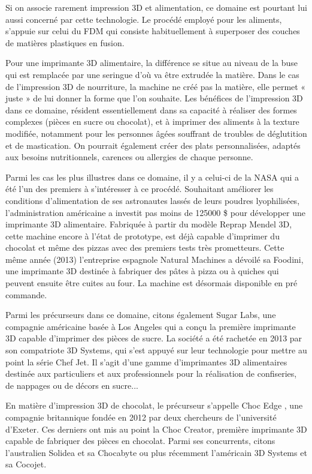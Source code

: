 \documentclass{article}
\begin{document}
Si on associe rarement impression 3D et alimentation, ce domaine est pourtant lui aussi concerné par cette technologie. Le procédé employé pour les aliments, s'appuie sur celui du FDM qui consiste habituellement à superposer des couches de matières plastiques en fusion.\hfill
 \par\leavevmode\par
Pour une imprimante 3D alimentaire, la différence se situe au niveau de la buse qui est remplacée par une seringue d'où va être extrudée la matière. Dans le cas de l'impression 3D de nourriture, la machine ne créé pas la matière, elle permet « juste » de lui donner la forme que l'on souhaite. Les bénéfices de l'impression 3D dans ce domaine, résident essentiellement dans sa capacité à réaliser des formes complexes (pièces en sucre ou chocolat), et à imprimer des aliments à la texture modifiée, notamment pour les personnes âgées souffrant de troubles de déglutition et de mastication. On pourrait également créer des plats personnalisées, adaptés aux besoins nutritionnels, carences ou allergies de chaque
personne.\hfill
 \par\leavevmode\par
Parmi les cas les plus illustres dans ce domaine, il y a celui-ci de la NASA qui a été l'un des premiers à s'intéresser à ce procédé. Souhaitant améliorer les conditions d'alimentation de ses astronautes lassés de leurs poudres lyophilisées, l'administration américaine a investit pas moins de 125000 \$ pour développer une imprimante 3D alimentaire. Fabriquée à partir du modèle Reprap Mendel 3D, cette machine encore à l'état de prototype, est déjà capable d'imprimer du chocolat et même des pizzas avec des premiers tests très prometteurs. Cette même année (2013) l'entreprise espagnole Natural Machines a dévoilé sa Foodini, une imprimante 3D destinée à fabriquer des pâtes à pizza ou à quiches qui peuvent ensuite être cuites au four. La machine est désormais disponible en pré commande.\hfill
 \par\leavevmode\par
Parmi les précurseurs dans ce domaine, citons également Sugar Labs, une compagnie américaine basée à Los Angeles qui a conçu la première imprimante 3D capable d'imprimer des pièces de sucre. La société a été rachetée en 2013 par son compatriote 3D Systems, qui s'est appuyé sur leur technologie pour mettre au point la série Chef Jet. Il s'agit d'une gamme d'imprimantes 3D alimentaires destinée aux particuliers et aux professionnels pour la réalisation de confiseries, de nappages ou de décors en sucre...\hfill 
 \par\leavevmode\par
En matière d'impression 3D de chocolat, le précurseur s'appelle Choc Edge , une compagnie britannique fondée en 2012 par deux chercheurs de l'université d'Exeter. Ces derniers ont mis au point la Choc Creator, première imprimante 3D capable de fabriquer des pièces en chocolat. Parmi ses concurrents, citons l'australien Solidea et sa Chocabyte ou plus récemment l'américain 3D Systems et sa Cocojet.
\end{document}
